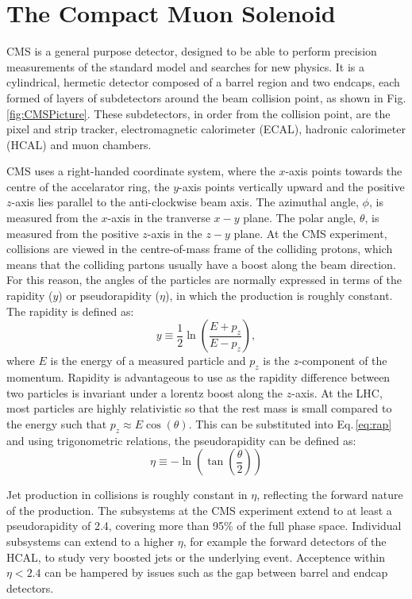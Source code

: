 \section{The Compact Muon Solenoid}
\label{sec:CMS}

CMS is a general purpose detector, designed to be able to perform precision measurements of the standard model and searches for new physics. 
It is a cylindrical, hermetic detector composed of a barrel region and two endcaps, each formed of layers of subdetectors around the beam collision point, as shown in Fig. \ref{fig:CMSPicture}. 
These subdetectors, in order from the collision point, are the pixel and strip tracker, electromagnetic calorimeter (ECAL), hadronic calorimeter (HCAL) and muon chambers.

CMS uses a right-handed coordinate system, where the $x$-axis points towards the centre of the accelarator ring, the $y$-axis points vertically upward and the positive $z$-axis lies parallel to the anti-clockwise beam axis. 
The azimuthal angle, $\phi$, is measured from the $x$-axis in the tranverse $x-y$ plane. 
The polar angle, $\theta$, is measured from the positive $z$-axis in the $z-y$ plane.
At the CMS experiment, collisions are viewed in the centre-of-mass frame of the colliding protons, which means that the colliding partons usually have a boost along the beam direction.
For this reason, the angles of the particles are normally expressed in terms of the rapidity ($y$) or pseudorapidity ($\eta$), in which the production is roughly constant.  
The rapidity is defined as:
\begin{equation}
\label{eq:rap}
y\equiv {\frac{1}{2}}\ln\left({\frac{E+p_{z}}{E-p_{z}}}\right),
\end{equation}
where $E$ is the energy of a measured particle and $p_{z}$ is the $z$-component of the momentum.
Rapidity is advantageous to use as the rapidity difference between two particles is invariant under a lorentz boost along the $z$-axis.
At the LHC, most particles are highly relativistic so that the rest mass is small compared to the energy such that $p_{z}\approx E\cos(\theta)$. This can be substituted into Eq.\,\ref{eq:rap} and using trigonometric relations, the pseudorapidity can be defined as:
\begin{equation}
\label{eq:eta}
\eta \equiv -\ln\left(\tan\left({\frac{\theta}{2}}\right)\right)
\end{equation}

Jet production in \pp{} collisions is roughly constant in $\eta$, reflecting the forward nature of the production.
The subsystems at the CMS experiment extend to at least a pseudorapidity of 2.4, covering more than 95\% of the full phase space. 
Individual subsystems can extend to a higher $\eta$, for example the forward detectors of the HCAL, to study very boosted jets or the underlying event.
Acceptence within $\eta < 2.4$ can be hampered by issues such as the gap between barrel and endcap detectors.

